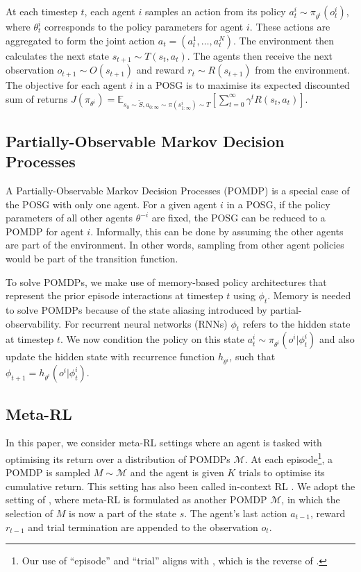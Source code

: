 \documentclass{article}
\begin{document}
At each timestep $t$, each agent $i$ samples an action from its policy $a^i_t \sim \pi_{\theta^i}(o^i_t)$, where $\theta^i_t$ corresponds to the policy parameters for agent $i$. These actions are aggregated to form the joint action $a_t = (a^1_t, \dots, a^N_t)$. The environment then calculates the next state $s_{t+1} \sim T(s_t, a_t)$. The agents then receive the next observation $o_{t+1} \sim O(s_{t+1})$ and reward $r_t \sim R(s_{t+1})$ from the environment. The objective for each agent $i$ in a POSG is to maximise its expected discounted sum of returns $J(\pi_{\theta^i}) = \mathbb{E}_{s_0 \sim \tilde{S}, a_{0:\infty} \sim \pi( s^i_{1:\infty}) \sim T} \left [ \sum_{t=0}^\infty \gamma^t R(s_t, a_t) \right ]$.

\subsection{Partially-Observable Markov Decision Processes}
\label{subsec:pomdp}

A Partially-Observable Markov Decision Processes (POMDP) \citep{kaelbling98} is a special case of the POSG with only one agent. For a given agent $i$ in a POSG, if the policy parameters of all other agents $\theta^{-i}$ are fixed, the POSG can be reduced to a POMDP for agent $i$. Informally, this can be done by assuming the other agents are part of the environment. In other words, sampling from other agent policies would be part of the transition function.

To solve POMDPs, we make use of memory-based policy architectures that represent the prior episode interactions at timestep $t$ using $\phi_t$. Memory is needed to solve POMDPs because of the state aliasing introduced by partial-observability. For recurrent neural networks (RNNs) $\phi_t$ refers to the hidden state at timestep $t$.
We now condition the policy on this state $a^i_t \sim \pi_{\theta^i}(o^i | \phi^i_t)$ and also update the hidden state with recurrence function $h_{\theta^i}$, such that $\phi_{t+1} = h_{\theta^i}(o^i | \phi^i_t)$.

\subsection{Meta-RL}

In this paper, we consider meta-RL settings where an agent is tasked with optimising its return over a distribution of POMDPs $\mathcal{M}$. At each episode\footnote{Our use of ``episode'' and ``trial'' aligns with \cite{Bauer23}, which is the reverse of \cite{Duan16}.}, a POMDP is sampled $M \sim \mathcal{M}$ and the agent is given $K$ trials to optimise its cumulative return. This setting has also been called in-context RL \citep{Laskin22}. We adopt the setting of \cite{ni21}, where meta-RL is formulated as another POMDP $\mathcal{M}$, in which the selection of $M$ is now a part of the state $s$. The agent's last action $a_{t-1}$, reward $r_{t-1}$ and trial termination are appended to the observation $o_t$.
\end{document}
